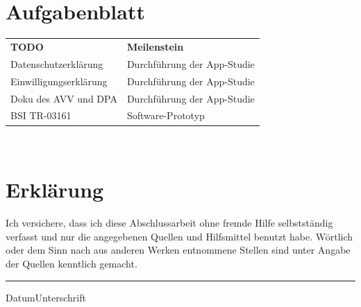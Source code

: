 
\maketitle
\clearpage
~
\newpage



\clearpage

    {

    }
    {
      ~
      \newpage
      \vfill
      \section*{Aufgabenblatt}
      \begin{tabular}{l|l}
        \textbf{TODO} & \textbf{Meilenstein} \\
        Datenschutzerklärung & Durchführung der App-Studie \\
        Einwilligungserklärung & Durchführung der App-Studie \\
        Doku des AVV und DPA & Durchführung der App-Studie \\
        BSI TR-03161 & Software-Prototyp \\
      \end{tabular}
      \vfill
      \clearpage
      ~
      \newpage
    }
\vspace{10ex}
\section*{Erklärung}
Ich  versichere, dass  ich diese  Abschlussarbeit ohne  fremde  Hilfe selbstständig
verfasst und  nur die  angegebenen Quellen und  Hilfsmittel benutzt  habe. Wörtlich
oder dem  Sinn nach  aus anderen  Werken entnommene Stellen  sind unter  Angabe der
Quellen kenntlich gemacht.
\vspace{10ex}\\

\hrule
{\small{Datum}}\hfill{\small{Unterschrift}}


\tableofcontents
\listoffigures


